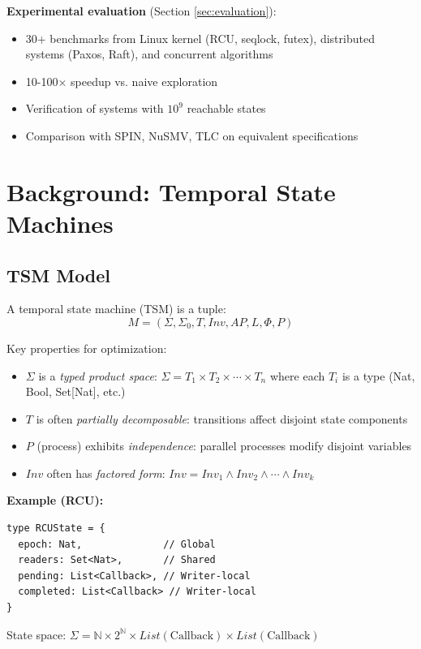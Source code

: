 \documentclass[conference]{IEEEtran}
\begin{document}
\textbf{Experimental evaluation} (Section \ref{sec:evaluation}):
\begin{itemize}
\item 30+ benchmarks from Linux kernel (RCU, seqlock, futex), distributed systems (Paxos, Raft), and concurrent algorithms
\item 10-100× speedup vs. naive exploration
\item Verification of systems with $10^9$ reachable states
\item Comparison with SPIN, NuSMV, TLC on equivalent specifications
\end{itemize}

\section{Background: Temporal State Machines}

\subsection{TSM Model}

A temporal state machine (TSM) is a tuple:
\begin{equation}
M = (\Sigma, \Sigma_0, T, Inv, AP, L, \Phi, P)
\end{equation}

Key properties for optimization:
\begin{itemize}
\item $\Sigma$ is a \textit{typed product space}: $\Sigma = T_1 \times T_2 \times \cdots \times T_n$ where each $T_i$ is a type (Nat, Bool, Set[Nat], etc.)
\item $T$ is often \textit{partially decomposable}: transitions affect disjoint state components
\item $P$ (process) exhibits \textit{independence}: parallel processes modify disjoint variables
\item $Inv$ often has \textit{factored form}: $Inv = Inv_1 \wedge Inv_2 \wedge \cdots \wedge Inv_k$
\end{itemize}

\textbf{Example (RCU):}
\begin{lstlisting}
type RCUState = {
  epoch: Nat,              // Global
  readers: Set<Nat>,       // Shared
  pending: List<Callback>, // Writer-local
  completed: List<Callback> // Writer-local
}
\end{lstlisting}

State space: $\Sigma = \mathbb{N} \times 2^{\mathbb{N}} \times List(\text{Callback}) \times List(\text{Callback})$
\end{document}

